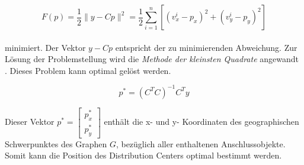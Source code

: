 \begin{equation}\label{e:guetefunktion1}
		F(p) = \frac{1}{2} \| y - Cp \|^2 = \frac{1}{2} \sum_{i=1}^{n} [(v_{x}^i 
- p_{x})^2 + (v_{y}^i - p_{y})^2]
\end{equation} \\
minimiert. Der Vektor $y - Cp$ entspricht der zu minimierenden Abweichung. Zur Lösung der Problemstellung wird die \textit{Methode der kleinsten 
Quadrate} angewandt \cite{papageorgiou}. Dieses Problem kann optimal gelöst werden.

\begin{equation}
	p^* = (C^T C)^{-1} C^T y
\end{equation} 

Dieser Vektor $p^* = \begin{bmatrix}p^*_{x} \\ p^*_{y} \end{bmatrix}$ enthält die x- und y- Koordinaten des geographischen Schwerpunktes des Graphen $G$, 
bezüglich aller enthaltenen Anschlussobjekte. Somit kann die Position des Distribution Centers optimal bestimmt werden.


